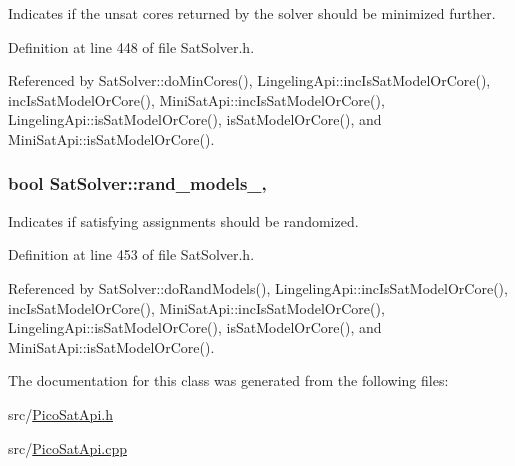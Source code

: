 Indicates if the unsat cores returned by the solver should be minimized further. 



Definition at line 448 of file Sat\-Solver.\-h.



Referenced by Sat\-Solver\-::do\-Min\-Cores(), Lingeling\-Api\-::inc\-Is\-Sat\-Model\-Or\-Core(), inc\-Is\-Sat\-Model\-Or\-Core(), Mini\-Sat\-Api\-::inc\-Is\-Sat\-Model\-Or\-Core(), Lingeling\-Api\-::is\-Sat\-Model\-Or\-Core(), is\-Sat\-Model\-Or\-Core(), and Mini\-Sat\-Api\-::is\-Sat\-Model\-Or\-Core().

\hypertarget{classSatSolver_a73fed24d8fb4da85ef82dc53ac5f28c7}{
\subsubsection[{rand\-\_\-models\-\_\-}]{\setlength{\rightskip}{0pt plus 5cm}bool Sat\-Solver\-::rand\-\_\-models\-\_\-\hspace{0.3cm}{\ttfamily [protected]}, {\ttfamily [inherited]}}}\label{classSatSolver_a73fed24d8fb4da85ef82dc53ac5f28c7}


Indicates if satisfying assignments should be randomized. 



Definition at line 453 of file Sat\-Solver.\-h.



Referenced by Sat\-Solver\-::do\-Rand\-Models(), Lingeling\-Api\-::inc\-Is\-Sat\-Model\-Or\-Core(), inc\-Is\-Sat\-Model\-Or\-Core(), Mini\-Sat\-Api\-::inc\-Is\-Sat\-Model\-Or\-Core(), Lingeling\-Api\-::is\-Sat\-Model\-Or\-Core(), is\-Sat\-Model\-Or\-Core(), and Mini\-Sat\-Api\-::is\-Sat\-Model\-Or\-Core().



The documentation for this class was generated from the following files\-:\begin{DoxyCompactItemize}
\item 
src/\hyperlink{PicoSatApi_8h}{Pico\-Sat\-Api.\-h}\item 
src/\hyperlink{PicoSatApi_8cpp}{Pico\-Sat\-Api.\-cpp}\end{DoxyCompactItemize}
